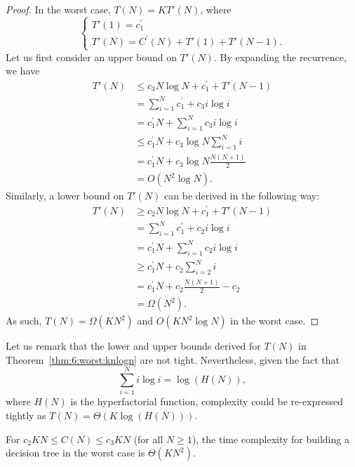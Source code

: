 \begin{proof}
In the worst case, $T(N) = K T'(N)$, where
\begin{equation}
\begin{cases}
T'(1) = c_1^\prime \\
T'(N) = C^\prime(N) +  T'(1) + T'(N-1).
\end{cases}
\end{equation}
Let us first consider an upper bound on $T'(N)$. By expanding the recurrence, we have
\begin{align}
T'(N) &\leq c_3 N \log N + c_1^\prime + T'(N-1) \nonumber \\
      &= \sum_{i=1}^N c_1^\prime + c_3 i\log i \nonumber \\
      &= c_1^\prime N + \sum_{i=1}^N c_3 i\log i \nonumber \\
      &\leq c_1^\prime N + c_3 \log N \sum_{i=1}^N i \nonumber \\
      &= c_1^\prime N + c_3 \log N \frac{N(N+1)}{2} \nonumber \\
      &= O(N^2 \log N).
\end{align}
Similarly, a lower
bound on $T'(N)$ can be derived in the following way:
\begin{align}
T'(N) &\geq c_2 N \log N + c_1^\prime + T'(N-1) \nonumber \\
      &= \sum_{i=1}^N c_1^\prime + c_2 i\log i \nonumber \\
      &= c_1^\prime N + \sum_{i=1}^N c_2 i\log i \nonumber \\
      &\geq c_1^\prime N + c_2 \sum_{i=2}^N i \nonumber \\
      &= c_1^\prime N + c_2 \frac{N(N+1)}{2} - c_2 \nonumber \\
      &= \Omega(N^2).
\end{align}
As such, $T(N) = \Omega(K N^2)$ and $O(K N^2 \log N)$ in the worst case.
\end{proof}

Let us  remark that the lower and upper bounds derived for $T(N)$ in Theorem~\ref{thm:6:worst:knlogn} are not
tight. Nevertheless, given the fact that
\begin{equation}
\sum_{i=1}^N i \log i = \log(H(N)),
\end{equation}
where $H(N)$ is the hyperfactorial function, complexity
could be re-expressed tightly as $T(N) = \Theta(K \log(H(N)))$.

\begin{theorem}\label{thm:6:worst:kn}
For $c_2 K N \leq C(N)\leq c_3 K N$ (for all $N \geq 1$), the time complexity for building a decision
tree in the worst case is $\Theta(K N^2)$.
\end{theorem}

